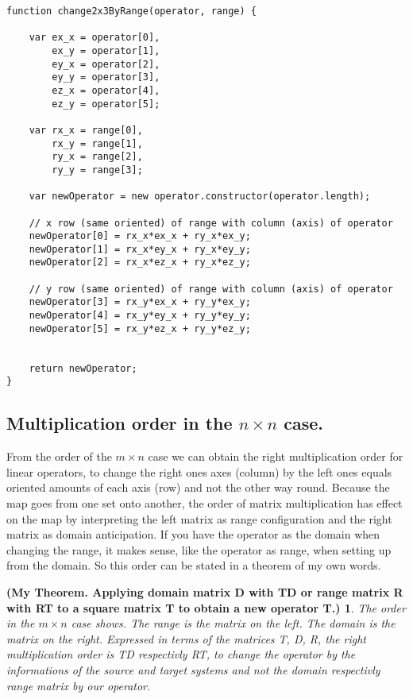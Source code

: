 \documentclass[a4paper]{article}
\begin{document}
\begin{lstlisting}
function change2x3ByRange(operator, range) {
    
    var ex_x = operator[0],
        ex_y = operator[1],
        ey_x = operator[2],
        ey_y = operator[3],
        ez_x = operator[4],
        ez_y = operator[5];
    
    var rx_x = range[0],
        rx_y = range[1],
        ry_x = range[2],
        ry_y = range[3];
        
    var newOperator = new operator.constructor(operator.length);
    
    // x row (same oriented) of range with column (axis) of operator
    newOperator[0] = rx_x*ex_x + ry_x*ex_y;
    newOperator[1] = rx_x*ey_x + ry_x*ey_y;
    newOperator[2] = rx_x*ez_x + ry_x*ez_y;
    
    // y row (same oriented) of range with column (axis) of operator
    newOperator[3] = rx_y*ex_x + ry_y*ex_y;
    newOperator[4] = rx_y*ey_x + ry_y*ey_y;
    newOperator[5] = rx_y*ez_x + ry_y*ez_y;
    
    
    return newOperator;
}

\end{lstlisting}




\subsection{Multiplication order in the $n \times n$ case.}

From the order of the $m \times n$ case we can obtain the right multiplication order for linear operators, to change the right ones axes (column) by the left ones equals oriented amounts of each axis (row) and not the other way round. Because the map goes from one set onto another, the order of matrix multiplication has effect on the map by interpreting the left matrix as range configuration and the right matrix as domain anticipation. If you have the operator as the domain when changing the range, it makes sense, like the operator as range, when setting up from the domain. So this order can be stated in a theorem of my own words.



\newtheorem{nbynorder}{(My Theorem. Applying domain matrix D with TD or range matrix R with RT to a square matrix T to obtain a new operator T.)}
\begin{nbynorder}
The order in the $m \times n$ case shows. The range is the matrix on the left. The domain is the matrix on the right. Expressed in terms of the matrices T, D, R, the right multiplication order is TD respectivly RT, to change the operator by the informations of the source and target systems and not the domain respectivly range matrix by our operator. 
\end{nbynorder}
\end{document}

